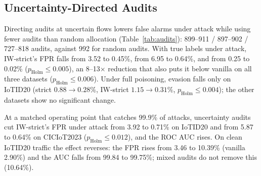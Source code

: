 \documentclass[conference]{IEEEtran}
\begin{document}
\subsection{Uncertainty-Directed Audits}
Directing audits at uncertain flows lowers false alarms under attack while using
fewer audits than random allocation (Table~\ref{tab:audits}): 899--911 /
897--902 / 727--818 audits, against 992 for random audits. With true labels
under attack, IW-strict's FPR falls from 3.52 to 0.45\%, from 6.95 to 0.64\%,
and from 0.25 to 0.02\% ($p_{\text{Holm}} \le 0.005$), an 8--13$\times$
reduction that also puts it below vanilla on all three datasets
($p_{\text{Holm}} \le 0.006$). Under full poisoning, evasion falls only on
IoTID20 (strict $0.88 \to 0.28\%$, IW-strict $1.15 \to 0.31\%$,
$p_{\text{Holm}} \le 0.004$); the other datasets show no significant change.

At a matched operating point that catches 99.9\% of attacks, uncertainty audits
cut IW-strict's FPR under attack from 3.92 to 0.71\% on IoTID20 and from 5.87 to
0.64\% on CICIoT2023 ($p_{\text{Holm}} \le 0.012$), and the ROC AUC rises. On
clean IoTID20 traffic the effect reverses: the FPR rises from 3.46 to 10.39\%
(vanilla 2.90\%) and the AUC falls from 99.84 to 99.75\%; mixed audits do not
remove this (10.64\%).
\end{document}
